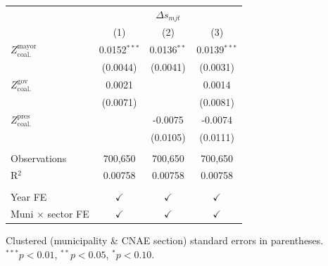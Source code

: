 \begingroup
\centering
\begin{tabular}{lccc}
   \toprule
    & \multicolumn{3}{c}{$\Delta s_{mjt}$}\\
                                       & (1)            & (2)           & (3)\\  
   \midrule 
   $Z^{\text{mayor}}_{\text{coal.}}$   & 0.0152$^{***}$ & 0.0136$^{**}$ & 0.0139$^{***}$\\   
                                       & (0.0044)       & (0.0041)      & (0.0031)\\   
   $Z^{\text{gov}}_{\text{coal.}}$     & 0.0021         &               & 0.0014\\   
                                       & (0.0071)       &               & (0.0081)\\   
   $Z^{\text{pres}}_{\text{coal.}}$    &                & -0.0075       & -0.0074\\   
                                       &                & (0.0105)      & (0.0111)\\   
    \\
   Observations                        & 700,650        & 700,650       & 700,650\\  
   R$^2$                               & 0.00758        & 0.00758       & 0.00758\\  
    \\
   Year FE                             & $\checkmark$   & $\checkmark$  & $\checkmark$\\   
   Muni $\times$ sector FE             & $\checkmark$   & $\checkmark$  & $\checkmark$\\   
   \bottomrule
\end{tabular}
 
\par \raggedright 
Clustered (municipality \& CNAE section) standard errors in parentheses. $^{***}p<0.01$, $^{**}p<0.05$, $^{*}p<0.10$.
\par\endgroup

